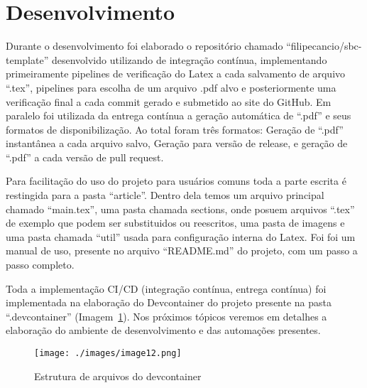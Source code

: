 \section{Desenvolvimento}

Durante o desenvolvimento foi elaborado o repositório chamado ``filipecancio/sbc-template'' desenvolvido utilizando de integração contínua, implementando primeiramente pipelines de verificação do Latex a cada salvamento de arquivo ``.tex'', pipelines para escolha de um arquivo .pdf alvo e posteriormente uma verificação final a cada commit gerado e submetido ao site do GitHub. Em paralelo foi utilizada da entrega contínua a geração automática de ``.pdf'' e seus formatos de disponibilização. Ao total foram três formatos: Geração de ``.pdf'' instantânea a cada arquivo salvo, Geração para versão de release, e geração de ``.pdf'' a cada versão de pull request.

Para facilitação do uso do projeto para usuários comuns toda a parte escrita é restingida para a pasta ``article''. Dentro dela temos um arquivo principal chamado ``main.tex'', uma pasta chamada sections, onde posuem arquivos ``.tex'' de exemplo que podem ser substituidos ou reescritos, uma pasta de imagens e uma pasta chamada ``util'' usada para configuração interna do Latex.
Foi foi um manual de uso, presente no arquivo ``README.md'' do projeto, com um passo a passo completo.

Toda a implementação CI/CD (integração contínua, entrega contínua) foi implementada na elaboração do Devcontainer do projeto presente na pasta ``.devcontainer'' (Imagem~\ref{fig:image12}). Nos próximos tópicos veremos em detalhes a elaboração do ambiente de desenvolvimento e das automações
presentes.

\begin{figure}[ht]
	\centering
	\texttt{[image: ./images/image12.png]}
	\caption{Estrutura de arquivos do devcontainer}
	\label{fig:image12}
\end{figure}